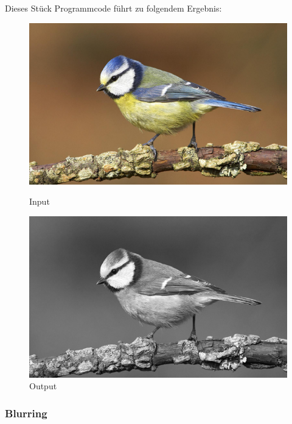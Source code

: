 Dieses Stück Programmcode führt zu folgendem Ergebnis:

\begin{figure}[htb]
    \centering
    \begin{minipage}[t]{0.45\linewidth}
        \centering
        \includegraphics[width=\linewidth]{pics/bildverarbeitungsalgos/input.png}
        \caption{Input \cite{maai:input:cite}}
        \label{maai:grayscaling:input}
    \end{minipage}
    \hfill
    \begin{minipage}[t]{0.45\linewidth}
        \centering
        \includegraphics[width=\linewidth]{pics/bildverarbeitungsalgos/grayscaling_output.png}
        \caption{Output}
        \label{maai:grayscaling:output}
    \end{minipage}
\end{figure}

\subsubsection{Blurring}\label{maai:blurring}

